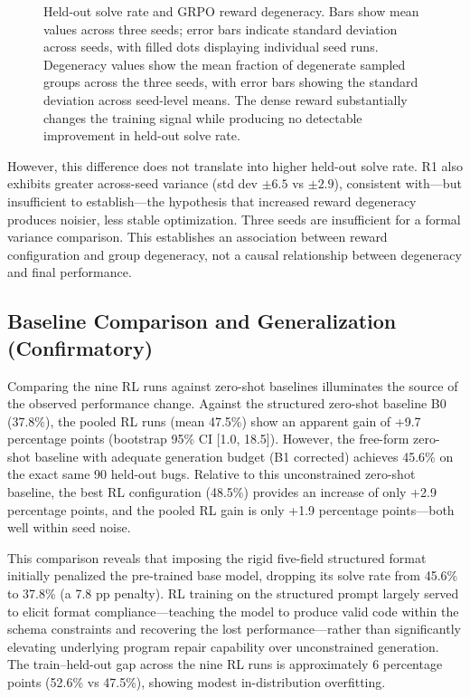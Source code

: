 \documentclass{article}
\begin{document}
\begin{figure}[t]
\caption{Held-out solve rate and GRPO reward degeneracy. Bars show mean values across three seeds; error bars indicate standard deviation across seeds, with filled dots displaying individual seed runs. Degeneracy values show the mean fraction of degenerate sampled groups across the three seeds, with error bars showing the standard deviation across seed-level means. The dense reward substantially changes the training signal while producing no detectable improvement in held-out solve rate.}
\label{fig:main_results}
\end{figure}

However, this difference does not translate into higher held-out solve rate. R1 also exhibits greater across-seed variance (std dev $\pm 6.5$ vs $\pm 2.9$), consistent with---but insufficient to establish---the hypothesis that increased reward degeneracy produces noisier, less stable optimization. Three seeds are insufficient for a formal variance comparison. This establishes an association between reward configuration and group degeneracy, not a causal relationship between degeneracy and final performance.

\subsection{Baseline Comparison and Generalization (Confirmatory)}
Comparing the nine RL runs against zero-shot baselines illuminates the source of the observed performance change. Against the structured zero-shot baseline B0 (37.8\%), the pooled RL runs (mean 47.5\%) show an apparent gain of +9.7 percentage points (bootstrap 95\% CI [1.0, 18.5]). However, the free-form zero-shot baseline with adequate generation budget (B1 corrected) achieves 45.6\% on the exact same 90 held-out bugs. Relative to this unconstrained zero-shot baseline, the best RL configuration (48.5\%) provides an increase of only +2.9 percentage points, and the pooled RL gain is only +1.9 percentage points—both well within seed noise. 

This comparison reveals that imposing the rigid five-field structured format initially penalized the pre-trained base model, dropping its solve rate from 45.6\% to 37.8\% (a 7.8 pp penalty). RL training on the structured prompt largely served to elicit format compliance—teaching the model to produce valid code within the schema constraints and recovering the lost performance—rather than significantly elevating underlying program repair capability over unconstrained generation. The train--held-out gap across the nine RL runs is approximately 6 percentage points (52.6\% vs 47.5\%), showing modest in-distribution overfitting.
\end{document}
